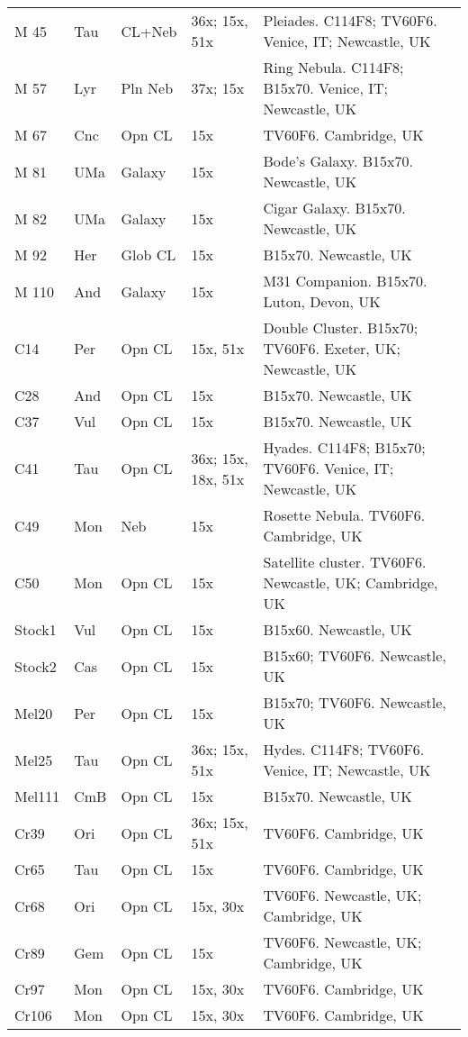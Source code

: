 \begin{longtable}{ p{0.8in}  p{0.3in}  p{0.5in}  p{0.9in}  p{5.8in} }
M 45 & Tau & CL+Neb & 36x; 15x, 51x & Pleiades. C114F8; TV60F6. Venice, IT; Newcastle, UK \\ 
M 57 & Lyr & Pln Neb & 37x; 15x & Ring Nebula. C114F8; B15x70. Venice, IT; Newcastle, UK \\ 
M 67 & Cnc & Opn CL & 15x & TV60F6. Cambridge, UK \\ 
M 81 & UMa & Galaxy & 15x & Bode's Galaxy. B15x70. Newcastle, UK \\ 
M 82 & UMa & Galaxy & 15x & Cigar Galaxy. B15x70. Newcastle, UK \\ 
M 92 & Her & Glob CL & 15x & B15x70. Newcastle, UK \\ 
M 110 & And & Galaxy & 15x & M31 Companion. B15x70. Luton, Devon, UK \\ 
C14 & Per & Opn CL & 15x, 51x & Double Cluster. B15x70; TV60F6. Exeter, UK; Newcastle, UK \\ 
C28 & And & Opn CL & 15x & B15x70. Newcastle, UK \\ 
C37 & Vul & Opn CL & 15x & B15x70. Newcastle, UK \\ 
C41 & Tau & Opn CL & 36x; 15x, 18x, 51x & Hyades. C114F8; B15x70; TV60F6. Venice, IT; Newcastle, UK \\ 
C49 & Mon & Neb & 15x & Rosette Nebula. TV60F6. Cambridge, UK \\ 
C50 & Mon & Opn CL & 15x & Satellite cluster. TV60F6. Newcastle, UK; Cambridge, UK \\ 
Stock1 & Vul & Opn CL & 15x & B15x60. Newcastle, UK \\ 
Stock2 & Cas & Opn CL & 15x & B15x60; TV60F6. Newcastle, UK \\ 
Mel20 & Per & Opn CL & 15x & B15x70; TV60F6. Newcastle, UK \\ 
Mel25 & Tau & Opn CL & 36x; 15x, 51x & Hydes. C114F8; TV60F6. Venice, IT; Newcastle, UK \\ 
Mel111 & CmB & Opn CL & 15x & B15x70. Newcastle, UK \\ 
Cr39 & Ori & Opn CL & 36x; 15x, 51x & TV60F6. Cambridge, UK \\ 
Cr65 & Tau & Opn CL & 15x & TV60F6. Cambridge, UK \\ 
Cr68 & Ori & Opn CL & 15x, 30x & TV60F6. Newcastle, UK; Cambridge, UK \\ 
Cr89 & Gem & Opn CL & 15x & TV60F6. Newcastle, UK; Cambridge, UK \\ 
Cr97 & Mon & Opn CL & 15x, 30x & TV60F6. Cambridge, UK \\ 
Cr106 & Mon & Opn CL & 15x, 30x & TV60F6. Cambridge, UK \\ 

\end{longtable}
